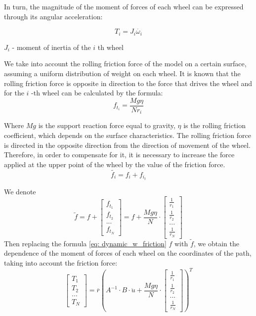 \documentclass[oneside,final,14pt]{extreport}
\begin{document}
In turn, the magnitude of the moment of forces of each wheel can be expressed through its angular acceleration:

\begin{equation}
T_{i}
=
J_{i} \dot{\omega_{i}}
\end{equation}

$ J_{i} $ - moment of inertia of the $ i $ th wheel

We take into account the rolling friction force of the model on a certain surface, assuming a uniform distribution of weight on each wheel. It is known that the rolling friction force is opposite in direction to the force that drives the wheel and for the $ i $ -th wheel can be calculated by the formula:
\begin{equation}
f_{t_{i}}
=
\frac{Mg \eta}{Nr_{i}}
\end{equation}

Where $ Mg $ is the support reaction force equal to gravity, $ \eta $ is the rolling friction coefficient, which depends on the surface characteristics.
The rolling friction force is directed in the opposite direction from the direction of movement of the wheel. Therefore, in order to compensate for it, it is necessary to increase the force applied at the upper point of the wheel by the value of the friction force.
\begin{equation}
\tilde{f_{i}}
=
f_{i}
+
f_{i_{t}}
\end{equation}

We denote
\begin{equation}
\tilde{f}
=
f
+
\begin{bmatrix}
f_{t_{1}} \\
f_{t_{2}} \\
... \\
f_{t_{N}}
\end{bmatrix}
=
f
+
\frac{Mg \eta}{N}
\cdot
\begin{bmatrix}
\frac
{1}{r_{1}} \\
\frac{1}{r_{2}} \\
... \\
\frac{1}{r_{N}}
\end{bmatrix}
\end{equation}
Then replacing the formula \ref{eq: dynamic_w_friction} $ f $ with $ \tilde{f} $, we obtain the dependence of the moment of forces of each wheel on the coordinates of the path, taking into account the friction force:
\begin{equation}
\begin{bmatrix}
T_{1} \\
T_{2} \\
... \\
T_{N}
\end{bmatrix}
=
\overline{r}
(
A ^{- 1}
\cdot
B
\cdot
\ddot{u}
+
\frac{Mg \eta}{N}
\cdot
\begin{bmatrix}
\frac{1}{r_{1}} \\
\frac{1}{r_{2}} \\
... \\
\frac{1}{r_{N}}
\end{bmatrix}
) ^{T}
\end{equation}
\end{document}
